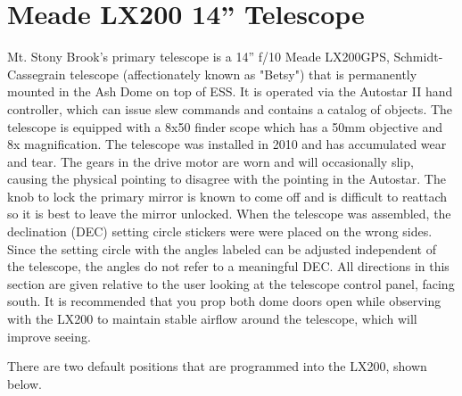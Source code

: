 \documentclass[12pt,titlepage]{article}
\begin{document}
\section{Meade LX200 14'' Telescope}
Mt. Stony Brook's primary telescope is a 14'' f/10 Meade LX200GPS, Schmidt-Cassegrain telescope (affectionately known as "Betsy") that is permanently mounted in the Ash Dome on top of ESS.
It is operated via the Autostar II hand controller, which can issue slew commands and contains a catalog of objects.
The telescope is equipped with a 8x50 finder scope which has a 50mm objective and 8x magnification.
The telescope was installed in 2010 and has accumulated wear and tear.
The gears in the drive motor are worn and will occasionally slip, causing the physical pointing to disagree with the pointing in the Autostar.
The knob to lock the primary mirror is known to come off and is difficult to reattach so it is best to leave the mirror unlocked. When the telescope was assembled, the declination (DEC) setting circle stickers were were placed on the wrong sides. Since the setting circle with the angles labeled can be adjusted independent of the telescope, the angles do not refer to a meaningful DEC.
All directions in this section are given relative to the user looking at the telescope control panel, facing south.
It is recommended that you prop both dome doors open while observing with the LX200 to maintain stable airflow around the telescope, which will improve seeing.
\par There are two default positions that are programmed into the LX200, shown below.
\end{document}
